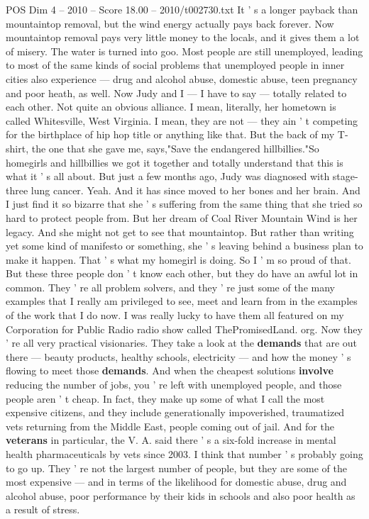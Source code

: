 \begin{textsample}{POS Dim 4 – 2010 – Score 18.00 – 2010/t002730.txt}
It ' s a longer payback than mountaintop removal, but the wind energy actually pays back forever.
Now mountaintop removal pays very little money to the locals, and it gives them a lot of misery.
The water is turned into goo.
Most people are still unemployed, leading to most of the same kinds of social problems that unemployed people in inner cities also experience — drug and alcohol abuse, domestic abuse, teen pregnancy and poor heath, as well.
Now Judy and I — I have to say — totally related to each other.
Not quite an obvious alliance.
I mean, literally, her hometown is called Whitesville, West Virginia.
I mean, they are not — they ain ' t competing for the birthplace of hip hop title or anything like that.
But the back of my T-shirt, the one that she gave me, says,"Save the endangered hillbillies."So homegirls and hillbillies we got it together and totally understand that this is what it ' s all about.
But just a few months ago, Judy was diagnosed with stage-three lung cancer.
Yeah.
And it has since moved to her bones and her brain.
And I just find it so bizarre that she ' s suffering from the same thing that she tried so hard to protect people from.
But her dream of Coal River Mountain Wind is her legacy.
And she might not get to see that mountaintop.
But rather than writing yet some kind of manifesto or something, she ' s leaving behind a business plan to make it happen.
That ' s what my homegirl is doing.
So I ' m so proud of that.
But these three people don ' t know each other, but they do have an awful lot in common.
They ' re all problem solvers, and they ' re just some of the many examples that I really am privileged to see, meet and learn from in the examples of the work that I do now.
I was really lucky to have them all featured on my Corporation for Public Radio radio show called ThePromisedLand. org.
Now they ' re all very practical visionaries.
They take a look at the \textbf{demands} that are out there — beauty products, healthy schools, electricity — and how the money ' s flowing to meet those \textbf{demands}.
And when the cheapest solutions \textbf{involve} reducing the number of jobs, you ' re left with unemployed people, and those people aren ' t cheap.
In fact, they make up some of what I call the most expensive citizens, and they include generationally impoverished, traumatized vets returning from the Middle East, people coming out of jail.
And for the \textbf{veterans} in particular, the V.
A. said there ' s a six-fold increase in mental health pharmaceuticals by vets since 2003.
I think that number ' s probably going to go up.
They ' re not the largest number of people, but they are some of the most expensive — and in terms of the likelihood for domestic abuse, drug and alcohol abuse, poor performance by their kids in schools and also poor health as a result of stress.

\end{textsample}
